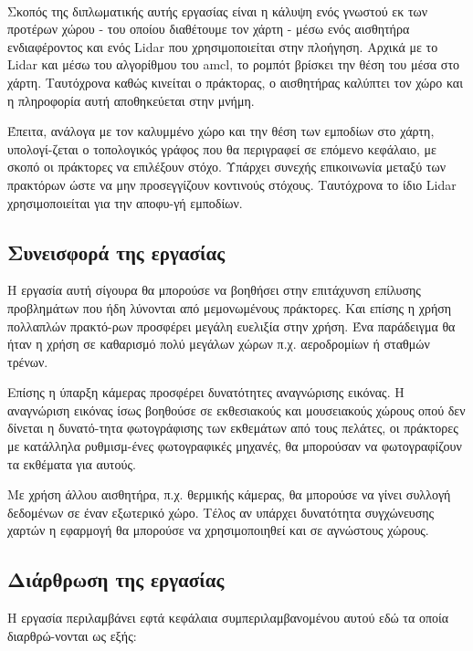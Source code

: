 \paragraph{}Σκοπός της διπλωματικής αυτής εργασίας είναι η κάλυψη ενός γνωστού εκ των προτέρων χώρου - του οποίου διαθέτουμε τον χάρτη - μέσω ενός αισθητήρα ενδιαφέροντος και ενός Lidar που χρησιμοποιείται στην πλοήγηση. Αρχικά με το Lidar και μέσω του αλγορίθμου του amcl, το ρομπότ βρίσκει την θέση του μέσα στο χάρτη. Ταυτόχρονα καθώς κινείται ο πράκτορας, ο αισθητήρας καλύπτει τον χώρο και η πληροφορία αυτή αποθηκεύεται στην μνήμη.

Έπειτα, ανάλογα με τον καλυμμένο χώρο και την θέση των εμποδίων στο χάρτη, υπολογί-ζεται ο τοπολογικός γράφος που θα περιγραφεί σε επόμενο κεφάλαιο, με σκοπό οι πράκτορες να επιλέξουν στόχο. Υπάρχει συνεχής επικοινωνία μεταξύ των πρακτόρων ώστε να μην προσεγγίζουν κοντινούς στόχους. Ταυτόχρονα το ίδιο Lidar χρησιμοποιείται για την αποφυ-γή εμποδίων.  
 
\subsection{Συνεισφορά της εργασίας}

Η εργασία αυτή σίγουρα θα μπορούσε να βοηθήσει στην επιτάχυνση επίλυσης προβλημάτων που ήδη λύνονται από μεμονωμένους πράκτορες. Και επίσης η χρήση πολλαπλών πρακτό-ρων προσφέρει μεγάλη ευελιξία στην χρήση. Ένα παράδειγμα θα ήταν η χρήση σε καθαρισμό πολύ μεγάλων χώρων π.χ. αεροδρομίων ή σταθμών τρένων.

Επίσης η ύπαρξη κάμερας προσφέρει δυνατότητες αναγνώρισης εικόνας. Η αναγνώριση εικόνας ίσως βοηθούσε σε εκθεσιακούς και μουσειακούς χώρους οπού δεν δίνεται η δυνατό-τητα φωτογράφισης των εκθεμάτων από τους πελάτες, οι πράκτορες με κατάλληλα ρυθμισμ-ένες φωτογραφικές μηχανές, θα μπορούσαν να φωτογραφίζουν τα εκθέματα για αυτούς.

Με χρήση άλλου αισθητήρα, π.χ. θερμικής κάμερας, θα μπορούσε να γίνει συλλογή δεδομένων σε έναν εξωτερικό χώρο. Τέλος αν υπάρχει δυνατότητα συγχώνευσης χαρτών η εφαρμογή θα μπορούσε να χρησιμοποιηθεί και σε αγνώστους χώρους.


\subsection{Διάρθρωση της εργασίας}

Η εργασία περιλαμβάνει εφτά κεφάλαια συμπεριλαμβανομένου αυτού εδώ τα οποία διαρθρώ-νονται ως εξής:


